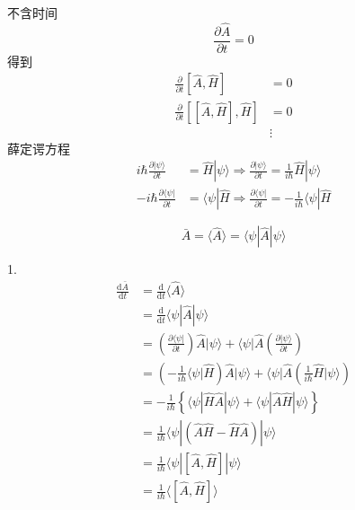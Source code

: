不含时间
\begin{equation}
    \frac{\partial \hat{A}}{\partial t}=0
\end{equation}
得到
\begin{equation}
    \begin{aligned}
        \frac{\partial}{\partial t}[\hat{A},\hat{H}]&=0
\\
\frac{\partial}{\partial t}[[\hat{A},\hat{H}],\hat{H}]&=0
\\
&\vdots 
    \end{aligned}
\end{equation}
薛定谔方程
\begin{equation}
    \begin{aligned}
        i\hbar \frac{\partial |\psi \rangle}{\partial t}&=\hat{H}|\psi \rangle \Rightarrow \frac{\partial |\psi \rangle}{\partial t}=\frac{1}{i\hbar}\hat{H}|\psi \rangle 
\\
-i\hbar \frac{\partial \langle \psi |}{\partial t}&=\langle \psi |\hat{H}\Rightarrow \frac{\partial \langle \psi |}{\partial t}=-\frac{1}{i\hbar}\langle \psi |\hat{H}
    \end{aligned}
\end{equation}

\begin{equation}
    \bar{A}=\langle \hat{A}\rangle =\langle \psi |\hat{A}|\psi \rangle 
\end{equation}

1.
\begin{equation}
    \begin{aligned}
        \frac{\mathrm{d}\bar{A}}{\mathrm{d}t}&=\frac{\mathrm{d}}{\mathrm{d}t}\langle \hat{A}\rangle 
\\
&=\frac{\mathrm{d}}{\mathrm{d}t}\langle \psi |\hat{A}|\psi \rangle 
\\
&=\left( \frac{\partial \langle \psi |}{\partial t} \right) \hat{A}|\psi \rangle +\langle \psi |\hat{A}\left( \frac{\partial |\psi \rangle}{\partial t} \right) 
\\
&=\left( -\frac{1}{i\hbar}\langle \psi |\hat{H} \right) \hat{A}|\psi \rangle +\langle \psi |\hat{A}\left( \frac{1}{i\hbar}\hat{H}|\psi \rangle \right) 
\\
&=-\frac{1}{i\hbar}\left\{ \langle \psi |\hat{H}\hat{A}|\psi \rangle +\langle \psi |\hat{A}\hat{H}|\psi \rangle \right\} 
\\
&=\frac{1}{i\hbar}\langle \psi |\left( \hat{A}\hat{H}-\hat{H}\hat{A} \right) |\psi \rangle 
\\
&=\frac{1}{i\hbar}\langle \psi |[\hat{A},\hat{H}]|\psi \rangle 
\\
&=\frac{1}{i\hbar}\langle [\hat{A},\hat{H}]\rangle 
    \end{aligned}
\end{equation}


